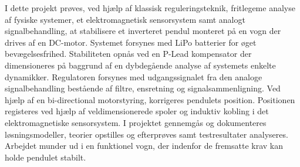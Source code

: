 I dette projekt prøves, ved hjælp af klassisk reguleringsteknik, fritlegeme analyse af fysiske systemer, et elektromagnetisk sensorsystem samt analogt signalbehandling, at stabilisere et inverteret pendul monteret på en vogn der drives af en DC-motor.
Systemet forsynes med LiPo batterier for øget bevægelsesfrihed. 
Stabiliteten opnås ved en P-Lead kompensator der dimensioneres på baggrund af en dybdegående analyse af systemets enkelte dynamikker. 
Regulatoren forsynes med udgangssignalet fra den analoge signalbehandling bestående af filtre, ensretning og signalsammenligning. 
Ved hjælp af en bi-directional motorstyring, korrigeres pendulets position. 
Positionen registeres ved hjælp af veldimensionerede spoler og induktiv kobling i det elektromagnetiske sensorsystem.    
I projektet gennemgås og dokumenteres løsningsmodeller, teorier opstilles og efterprøves samt testresultater analyseres.
Arbejdet munder ud i en funktionel vogn, der indenfor de fremsatte krav kan holde pendulet stabilt.